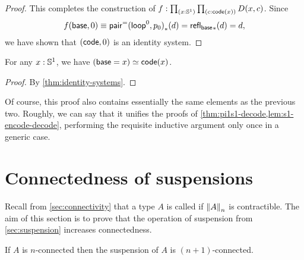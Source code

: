 \begin{proof}
  This completes the construction of $f:\prd{x:\Sn^1}{c:\code(x)} D(x,c)$.
  Since
  \[f(\base,0) \jdeq \trans{\pairpath(\lloop^0,p_0)}{d} = \trans{\refl{\base}}{d} = d,\]
  we have shown that $(\code,0)$ is an identity system.
\end{proof}

\begin{cor}
  For any $x:\Sn^1$, we have $\eqv{(\base=x)}{\code(x)}$.
\end{cor}
\begin{proof}
  By \autoref{thm:identity-systems}.
\end{proof}

Of course, this proof also contains essentially the same elements as the previous two.
Roughly, we can say that it unifies the proofs of \autoref{thm:pi1s1-decode,lem:s1-encode-decode}, performing the requisite inductive argument only once in a generic case.


\section{Connectedness of suspensions}
\label{sec:conn-susp}

Recall from \autoref{sec:connectivity} that a type $A$ is called  if $\trunc nA$ is contractible.
The aim of this section is to prove that the operation of suspension from \autoref{sec:suspension} increases connectedness.

\begin{thm} \label{thm:suspension-increases-connectedness}
  If $A$ is $n$-connected then the suspension of $A$ is $(n+1)$-connected.
\end{thm}

